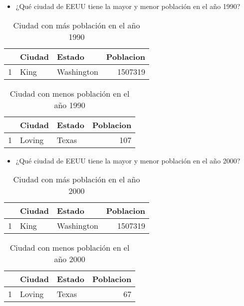 \begin{itemize}
\item ¿Qué ciudad de EEUU tiene la mayor y menor población en el año 1990?
\end{itemize}

\begin{table}[ht]
\centering
\begin{tabular}{rllr}
  \hline
 & Ciudad & Estado & Poblacion \\ 
  \hline
1 & King & Washington & 1507319 \\ 
   \hline
\end{tabular}
\caption{Ciudad con más población en el año 1990} 
\end{table}


\begin{table}[ht]
\centering
\begin{tabular}{rllr}
  \hline
 & Ciudad & Estado & Poblacion \\ 
  \hline
1 & Loving & Texas & 107 \\ 
   \hline
\end{tabular}
\caption{Ciudad con menos población en el año 1990} 
\end{table}


\begin{itemize}
\item ¿Qué ciudad de EEUU tiene la mayor y menor población en el año 2000?
\end{itemize}

\begin{table}[ht]
\centering
\begin{tabular}{rllr}
  \hline
 & Ciudad & Estado & Poblacion \\ 
  \hline
1 & King & Washington & 1507319 \\ 
   \hline
\end{tabular}
\caption{Ciudad con más población en el año 2000} 
\end{table}


\begin{table}[ht]
\centering
\begin{tabular}{rllr}
  \hline
 & Ciudad & Estado & Poblacion \\ 
  \hline
1 & Loving & Texas &  67 \\ 
   \hline
\end{tabular}
\caption{Ciudad con menos población en el año 2000} 
\end{table}


